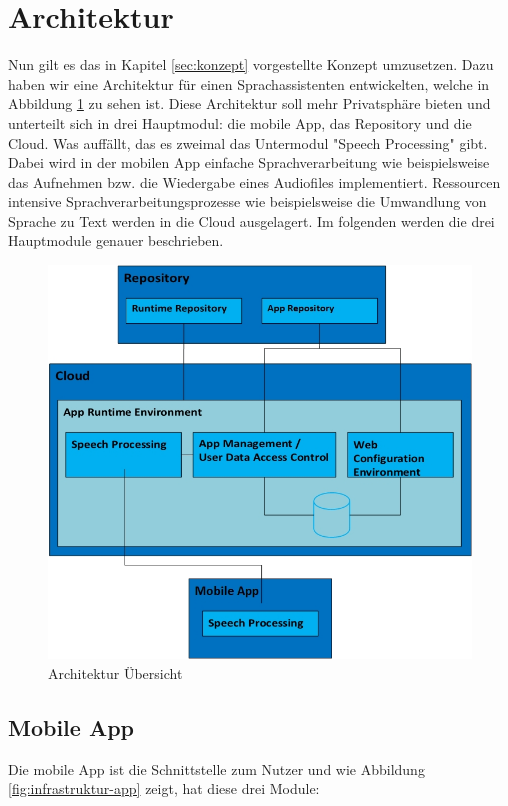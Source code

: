 \section{Architektur}
Nun gilt es das in Kapitel \ref{sec:konzept} vorgestellte Konzept umzusetzen. Dazu haben wir eine Architektur für einen Sprachassistenten entwickelten, welche in Abbildung \ref{fig:infrastruktur-overview} zu sehen ist. Diese Architektur soll mehr Privatsphäre bieten und unterteilt sich in drei Hauptmodul: die mobile App, das Repository und die Cloud. Was auffällt, das es zweimal das Untermodul "Speech Processing" gibt. Dabei wird in der mobilen App einfache Sprachverarbeitung wie beispielsweise das Aufnehmen bzw. die Wiedergabe eines Audiofiles implementiert. Ressourcen intensive Sprachverarbeitungsprozesse wie beispielsweise die Umwandlung von Sprache zu Text werden in die Cloud ausgelagert. Im folgenden werden die drei Hauptmodule genauer beschrieben.
\begin{figure}[h!]
	\centering
	\includegraphics[width=0.9\linewidth]{Picture/Infrastruktur-Overview.jpg}
	\caption[Architektur Übersicht]{Architektur Übersicht}
	\label{fig:infrastruktur-overview}
\end{figure}

\subsection{Mobile App}
Die mobile App ist die Schnittstelle zum Nutzer und wie Abbildung \ref{fig:infrastruktur-app} zeigt, hat diese drei Module:

